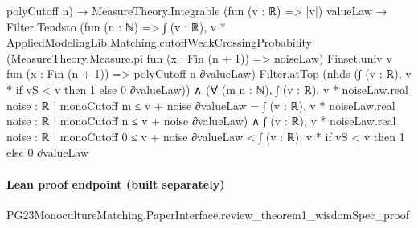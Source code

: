 \documentclass[10pt]{article}
\begin{document}
\begin{ReviewVerbatim}
                              polyCutoff n) →
                          MeasureTheory.Integrable (fun (v : ℝ) => |v|) valueLaw →
                            Filter.Tendsto
                                (fun (n : ℕ) =>
                                  ∫ (v : ℝ),
                                    v *
                                      AppliedModelingLib.Matching.cutoffWeakCrossingProbability
                                        (MeasureTheory.Measure.pi fun (x : Fin (n + 1)) => noiseLaw) Finset.univ v
                                        fun (x : Fin (n + 1)) => polyCutoff n ∂valueLaw)
                                Filter.atTop (nhds (∫ (v : ℝ), v * if vS < v then 1 else 0 ∂valueLaw)) ∧
                              (∀ (m n : ℕ),
                                  ∫ (v : ℝ), v * noiseLaw.real {noise : ℝ | monoCutoff m ≤ v + noise} ∂valueLaw =
                                    ∫ (v : ℝ), v * noiseLaw.real {noise : ℝ | monoCutoff n ≤ v + noise} ∂valueLaw) ∧
                                ∫ (v : ℝ), v * noiseLaw.real {noise : ℝ | monoCutoff 0 ≤ v + noise} ∂valueLaw <
                                  ∫ (v : ℝ), v * if vS < v then 1 else 0 ∂valueLaw
\end{ReviewVerbatim}

\paragraph{Lean proof endpoint (built separately)}\begin{ReviewVerbatim}
PG23MonocultureMatching.PaperInterface.review_theorem1_wisdomSpec_proof
\end{ReviewVerbatim}
\end{document}
